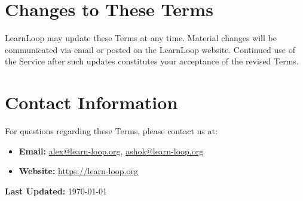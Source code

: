 \documentclass[12pt]{article}
\begin{document}
\section{Changes to These Terms}
LearnLoop may update these Terms at any time. Material changes will be communicated via email or posted on the LearnLoop website. Continued use of the Service after such updates constitutes your acceptance of the revised Terms.

\section{Contact Information}
For questions regarding these Terms, please contact us at:
\begin{itemize}[leftmargin=*]
    \item \textbf{Email:} \href{mailto:alex@learn-loop.org}{alex@learn-loop.org}, \href{mailto:ashok@learn-loop.org}{ashok@learn-loop.org}
    \item \textbf{Website:} \href{https://learn-loop.org}{https://learn-loop.org}
\end{itemize}

\vspace{1em}
\noindent \textbf{Last Updated:} \today
\end{document}

